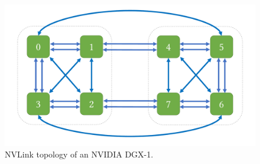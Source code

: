 



\begin{figure}
\includegraphics[page=1,width=\columnwidth]{figures/topos.pdf}
\caption{NVLink topology of an NVIDIA DGX-1.}
\label{fig:dgx1-topo}
\end{figure}

